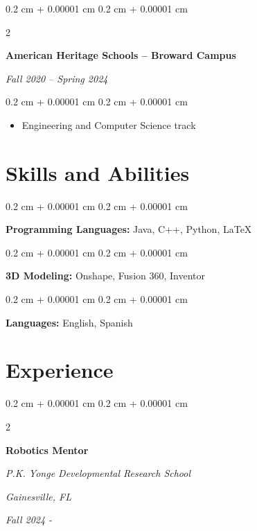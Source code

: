 \documentclass[10pt, letterpaper]{article}
\newenvironment{highlights}{
    \begin{itemize}[
        topsep=0.10 cm,
        parsep=0.10 cm,
        partopsep=0pt,
        itemsep=0pt,
        leftmargin=0.4 cm + 10pt
    ]
}{
    \end{itemize}
} %
\newenvironment{onecolentry}{
    \begin{adjustwidth}{
        0.2 cm + 0.00001 cm
    }{
        0.2 cm + 0.00001 cm
    }
}{
    \end{adjustwidth}
} %
\newenvironment{twocolentry}[2][]{
    \onecolentry
    \def\secondColumn{#2}
    \setcolumnwidth{\fill, 4.5 cm}
    \begin{paracol}{2}
}{
    \switchcolumn \raggedleft \secondColumn
    \end{paracol}
    \endonecolentry
} %
\begin{document}
        \begin{twocolentry}{
            
            
            \textit{Fall 2020 – Spring 2024}}
                \textbf{American Heritage Schools – Broward Campus}
    
            \end{twocolentry}
    
            \vspace{0.10 cm}
            \begin{onecolentry}
                \begin{highlights}
                    \item Engineering and Computer Science track
                \end{highlights}
            \end{onecolentry}
    
        
    \section{Skills and Abilities}



        
        \begin{onecolentry}
            \textbf{Programming Languages:} Java, C++, Python, LaTeX
        \end{onecolentry}
        
        \begin{onecolentry}
            \textbf{3D Modeling:} Onshape, Fusion 360, Inventor  
        \end{onecolentry}

        \begin{onecolentry}
            \textbf{Languages:} English, Spanish
        \end{onecolentry}

    \section{Experience}



        
        \begin{twocolentry}{
        \textit{Gainesville, FL}    
            
        \textit{Fall 2024 -}}
            \textbf{Robotics Mentor}
            
            \textit{P.K. Yonge Developmental Research School}
        \end{twocolentry}
\end{document}
